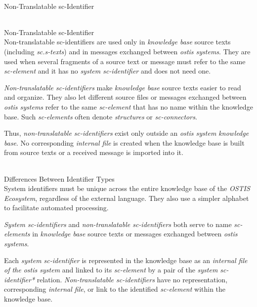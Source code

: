 \begin{frame}{\\Non-Translatable sc-Identifier}
	\topline
	\justifying
\begin{SCn}
\end{SCn}

\end{frame}

\begin{frame}{\\Non-Translatable sc-Identifier}
	\topline
	\justifying
	\vspace*{\fill}\\
	\footnotesize
	Non-translatable sc-identifiers are used only in \textit{knowledge base} source texts (including \textit{sc.s-texts}) and in messages exchanged between \textit{ostis systems}. They are used when several fragments of a source text or message must refer to the same \textit{sc-element} and it has no \textit{system sc-identifier} and does not need one.

	\bigskip
	\textit{Non-translatable sc-identifiers} make \textit{knowledge base} source texts easier to read and organize. They also let different source files or messages exchanged between \textit{ostis systems} refer to the same \textit{sc-element} that has no name within the knowledge base. Such \textit{sc-elements} often denote \textit{structures} or \textit{sc-connectors}.

	\bigskip
	Thus, \textit{non-translatable sc-identifiers} exist only outside an \textit{ostis system knowledge base}. No corresponding \textit{internal file} is created when the knowledge base is built from source texts or a received message is imported into it.
\end{frame}

\begin{frame}{\\Differences Between Identifier Types}
	\topline
	\justifying
	\vspace*{\fill}\\
	\small
	System identifiers must be unique across the entire knowledge base of the \textit{OSTIS Ecosystem}, regardless of the external language. They also use a simpler alphabet to facilitate automated processing.

	\bigskip
	\textit{System sc-identifiers} and \textit{non-translatable sc-identifiers} both serve to name \textit{sc-elements} in \textit{knowledge base} source texts or messages exchanged between \textit{ostis systems}.

	\bigskip
	Each \textit{system sc-identifier} is represented in the knowledge base as an \textit{internal file of the ostis system} and linked to its \textit{sc-element} by a pair of the \textit{system \mbox{sc-identifier*}} relation. \textit{Non-translatable sc-identifiers} have no representation, corresponding \textit{internal file}, or link to the identified \textit{sc-element} within the knowledge base.
\end{frame}

